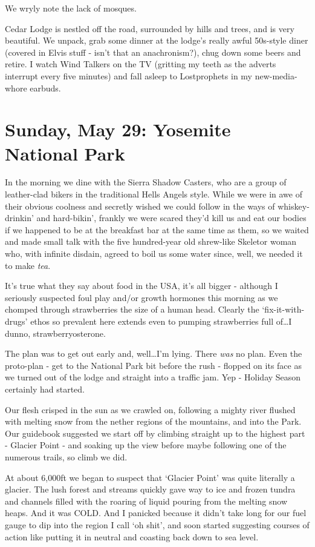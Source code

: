\documentclass[a5paper,10pt,titlepage,draft]{book}
\begin{document}
We wryly note the lack of mosques.

Cedar Lodge is nestled off the road, surrounded by hills and trees, and is very beautiful.  We unpack, grab some dinner at the lodge's really awful 50s-style diner (covered in Elvis stuff - isn't that an anachronism?), chug down some beers and retire.  I watch Wind Talkers on the TV (gritting my teeth as the adverts interrupt every five minutes) and fall asleep to Lostprophets in my new-media-whore earbuds.

\chapter[Yosemite National Park]{Sunday, May 29: Yosemite National Park}
In the morning we dine with the Sierra Shadow Casters, who are a group of leather-clad bikers in the traditional Hells Angels style.  While we were in awe of their obvious coolness and secretly wished we could follow in the ways of whiskey-drinkin' and hard-bikin', frankly we were scared they'd kill us and eat our bodies if we happened to be at the breakfast bar at the same time as them, so we waited and made small talk with the five hundred-year old shrew-like Skeletor woman who, with infinite disdain, agreed to boil us some water since, well, we needed it to make \emph{tea}.

It's true what they say about food in the USA, it's all bigger - although I seriously suspected foul play and/or growth hormones this morning as we chomped through strawberries the size of a human head.  Clearly the `fix-it-with-drugs' ethos so prevalent here extends even to pumping strawberries full of\ldots I dunno, strawberryosterone.

The plan was to get out early and, well\ldots I'm lying.  There \emph{was} no plan.  Even the proto-plan - get to the National Park bit before the rush - flopped on its face as we turned out of the lodge and straight into a traffic jam.  Yep - Holiday Season certainly had started.

Our flesh crisped in the sun as we crawled on, following a mighty river flushed with melting snow from the nether regions of the mountains, and into the Park.  Our guidebook suggested we start off by climbing straight up to the highest part - Glacier Point - and soaking up the view before maybe following one of the numerous trails, so climb we did.

At about 6,000ft we began to suspect that `Glacier Point' was quite literally a glacier.  The lush forest and streams quickly gave way to ice and frozen tundra and channels filled with the roaring of liquid pouring from the melting snow heaps.  And it was COLD.   And I panicked because it didn't take long for our fuel gauge to dip into the region I call `oh shit', and soon started suggesting courses of action like putting it in neutral and coasting back down to sea level.
\end{document}

